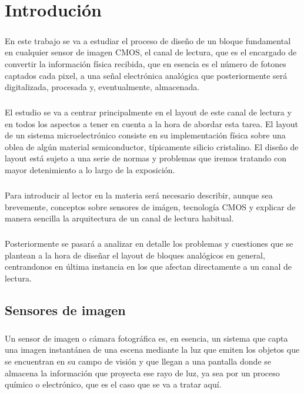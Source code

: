 \chapter{Introdución}

\paragraph{}
En este trabajo se va a estudiar el proceso de diseño de un bloque fundamental
en cualquier sensor de imagen CMOS, el canal de lectura, que es el encargado
de convertir la información física recibida, que en esencia es el número de fotones
captados cada pixel, a una señal electrónica analógica que posteriormente será digitalizada,
procesada y, eventualmente, almacenada.

\paragraph{}
El estudio se va a centrar principalmente en el layout de este canal de
lectura y en todos los aspectos a tener en cuenta a la hora de abordar esta tarea.
El layout de un sistema microelectrónico consiste en su implementación física
sobre una oblea de algún material semiconductor, típicamente silicio cristalino. El
diseño de layout está sujeto a una serie de normas y problemas que iremos tratando
con mayor detenimiento a lo largo de la exposición.

\paragraph{}
Para introducir al lector en la materia será necesario describir, aunque sea
brevemente, conceptos sobre sensores de imágen, tecnología CMOS y explicar de manera
sencilla la arquitectura de un canal de lectura habitual.

\paragraph{}
Posteriormente se pasará a analizar en detalle los problemas y cuestiones que se
plantean a la hora de diseñar el layout de bloques analógicos en general,
centrandonos en última instancia en los que afectan directamente a un canal de lectura.

\section{Sensores de imagen}

\paragraph{}
Un sensor de imagen o cámara fotográfica es, en esencia, un sistema que capta
una imagen instantánea de una escena mediante la luz que emiten los objetos que
se encuentran en su campo de visión y que llegan a una pantalla donde se almacena
la información que proyecta ese rayo de luz, ya sea por un proceso químico
o electrónico, que es el caso que se va a tratar aquí.

